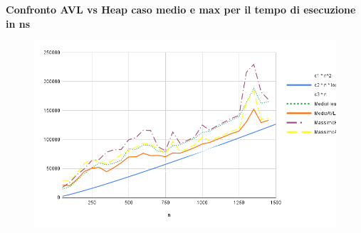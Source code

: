 \documentclass{article}
\begin{document}
 \vspace*{1 cm}
\begin{center}
    \Large \textbf{Confronto AVL vs Heap caso medio e max per il tempo di esecuzione in ns}
    \begin{figure}[h]
        \centering
        \vspace*{-0.1 cm}
        \includegraphics[width=0.95\linewidth]{Grafici/AVLvsHeapTs.png}
        \label{fig:graph}
    \end{figure}
\end{center}
\end{document}
